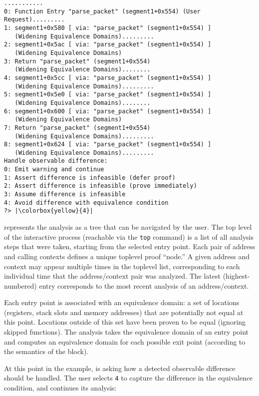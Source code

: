 \begin{lstlisting}
...........
0: Function Entry "parse_packet" (segment1+0x554) (User Request).........
1: segment1+0x580 [ via: "parse_packet" (segment1+0x554) ]
   (Widening Equivalence Domains).........
2: segment1+0x5ac [ via: "parse_packet" (segment1+0x554) ]
   (Widening Equivalence Domains)
3: Return "parse_packet" (segment1+0x554)
   (Widening Equivalence Domains)........
4: segment1+0x5cc [ via: "parse_packet" (segment1+0x554) ]
   (Widening Equivalence Domains).........
5: segment1+0x5e0 [ via: "parse_packet" (segment1+0x554) ]
   (Widening Equivalence Domains)........
6: segment1+0x600 [ via: "parse_packet" (segment1+0x554) ]
   (Widening Equivalence Domains)
7: Return "parse_packet" (segment1+0x554)
   (Widening Equivalence Domains).........
8: segment1+0x624 [ via: "parse_packet" (segment1+0x554) ]
   (Widening Equivalence Domains).........
Handle observable difference:
0: Emit warning and continue
1: Assert difference is infeasible (defer proof)
2: Assert difference is infeasible (prove immediately)
3: Assume difference is infeasible
4: Avoid difference with equivalence condition
?> |\colorbox{yellow}{4}|
\end{lstlisting}

\pate{} represents the analysis as a tree that can be navigated by the user.
The top level of the interactive process (reachable via the \texttt{top} command) is a list of all analysis steps that were taken, starting from the selected entry point.
Each pair of address and calling contexts defines a unique toplevel proof ``node.''
A given address and context may appear multiple times in the toplevel list, corresponding to each individual time that the address/context pair was analyzed.
The latest (highest-numbered) entry corresponds to the most recent analysis of an address/context.

Each entry point is associated with an equivalence domain: a set of locations (registers, stack slots and memory addresses) that are potentially not equal at this point.
Locations outside of this set have been proven to be equal (ignoring skipped functions).
The analysis takes the equivalence domain of an entry point and computes an equivalence domain for each possible exit point (according to the semantics of the block).

At this point in the example, \pate{} is asking how a detected observable difference should be handled.
The user selects \texttt{4} to capture the difference in the equivalence condition, and \pate{} continues its analysis:

